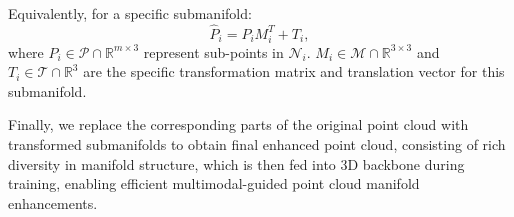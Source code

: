 Equivalently, for a specific submanifold:
\begin{equation}\label{eq:element trans}
    \hat{P}_i = P_iM_i^T + T_i,
\end{equation}
where $P_i \in \mathcal{P} \cap \mathbb{R}^{m \times 3}$ represent sub-points in $\mathcal{N}_i$. $M_i \in \mathcal{M} \cap \mathbb{R}^{3 \times3}$ and $T_i \in \mathcal{T} \cap \mathbb{R}^{3}$ are the specific transformation matrix and translation vector for this submanifold.

Finally, we replace the corresponding parts of the original point cloud with transformed submanifolds to obtain final enhanced point cloud, consisting of rich diversity in manifold structure, which is then fed into 3D backbone during training, enabling efficient multimodal-guided point cloud manifold enhancements.